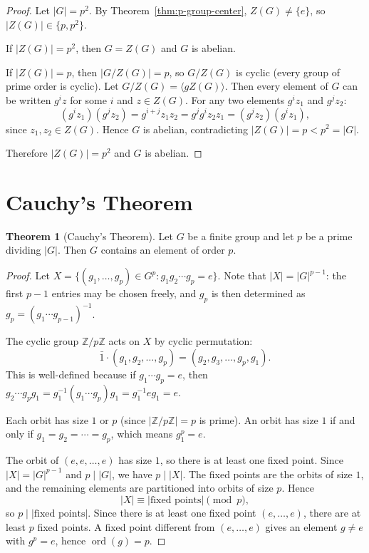 \documentclass[12pt,a4paper,openany]{book}
\theoremstyle{definition}
\newtheorem{theorem}{Theorem}[chapter]
\theoremstyle{remark}
\newcommand{\Z}{\mathbb{Z}}
\DeclareMathOperator{\ord}{ord}
\begin{document}
\begin{proof}
Let $|G|=p^2$.  By Theorem~\ref{thm:p-group-center},
$Z(G)\ne\{e\}$, so $|Z(G)|\in\{p,p^2\}$.

If $|Z(G)|=p^2$, then $G=Z(G)$ and $G$ is abelian.

If $|Z(G)|=p$, then $|G/Z(G)|=p$, so $G/Z(G)$ is cyclic (every group
of prime order is cyclic).  Let $G/Z(G)=\langle gZ(G)\rangle$.
Then every element of $G$ can be written $g^i z$ for some $i$ and
$z\in Z(G)$.  For any two elements $g^i z_1$ and $g^j z_2$:
\[
   (g^i z_1)(g^j z_2) = g^{i+j} z_1 z_2 = g^j g^i z_2 z_1
   = (g^j z_2)(g^i z_1),
\]
since $z_1,z_2\in Z(G)$.  Hence $G$ is abelian, contradicting
$|Z(G)|=p<p^2=|G|$.

Therefore $|Z(G)|=p^2$ and $G$ is abelian.
\end{proof}

\section{Cauchy's Theorem}\label{sec:cauchy}

\begin{theorem}[Cauchy's Theorem]\label{thm:cauchy}
Let $G$ be a finite group and let $p$ be a prime dividing $|G|$.
Then $G$ contains an element of order $p$.
\end{theorem}

\begin{proof}
Let $X = \{(g_1,\dots,g_p)\in G^p : g_1 g_2\cdots g_p = e\}$.
Note that $|X|=|G|^{p-1}$: the first $p-1$ entries may be chosen
freely, and $g_p$ is then determined as
$g_p=(g_1\cdots g_{p-1})^{-1}$.

The cyclic group $\Z/p\Z$ acts on $X$ by cyclic permutation:
\[
   \bar{1}\cdot(g_1,g_2,\dots,g_p) = (g_2,g_3,\dots,g_p,g_1).
\]
This is well-defined because if $g_1\cdots g_p=e$, then
$g_2\cdots g_p g_1 = g_1^{-1}(g_1\cdots g_p)g_1 = g_1^{-1}eg_1=e$.

Each orbit has size $1$ or $p$ (since $|\Z/p\Z|=p$ is prime).
An orbit has size $1$ if and only if $g_1=g_2=\cdots=g_p$, which
means $g_1^p=e$.

The orbit of $(e,e,\dots,e)$ has size $1$, so there is at least one
fixed point.  Since $|X|=|G|^{p-1}$ and $p\mid |G|$, we have
$p\mid |X|$.  The fixed points are the orbits of size $1$, and the
remaining elements are partitioned into orbits of size $p$.  Hence
\[
   |X| \equiv |\text{fixed points}| \pmod{p},
\]
so $p\mid|\text{fixed points}|$.  Since there is at least one fixed
point $(e,\dots,e)$, there are at least $p$ fixed points.  A fixed
point different from $(e,\dots,e)$ gives an element $g\ne e$ with
$g^p=e$, hence $\ord(g)=p$.
\end{proof}
\end{document}
